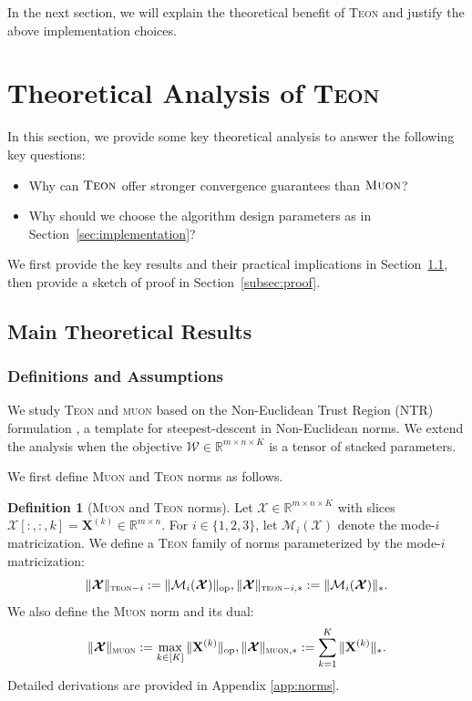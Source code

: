 \documentclass{article}
\newcommand{\ten}[1]{\bm{\mathcal{#1}}}
\newcommand{\mat}[1]{\mathbf{#1}}
\theoremstyle{plain}
\theoremstyle{definition}
\newtheorem{definition}[theorem]{Definition}
\theoremstyle{remark}
\begin{document}
In the next section, we will explain the theoretical benefit of \textsc{Teon} and justify the above implementation choices. 

\section{Theoretical Analysis of \textsc{Teon}}
\label{sec:Teon-theory}
In this section, we provide some key theoretical analysis to answer the following key questions: 
\begin{itemize}

\vspace{-5pt}
    \item Why can $\textsc{Teon}$ offer stronger convergence guarantees than $\textsc{Muon}$?
    \vspace{-5pt}
    \item Why should we choose the algorithm design parameters as in Section~\ref{sec:implementation}?
\end{itemize}

We first provide the key results and their practical implications in Section~\ref{sec:main_theo_results}, then provide a sketch of proof in Section~\ref{subsec:proof}.  

\subsection{Main Theoretical Results}
\label{sec:main_theo_results}


\subsubsection{Definitions and Assumptions}
\label{sec:definitions_and_assumptions}

We study \textsc{Teon} and \textsc{muon} based on the Non-Euclidean Trust Region (NTR) formulation \cite{kovalev2025understanding}, a template for steepest-descent in Non-Euclidean norms. We extend the analysis when the objective $\ten{W}\in\mathbb{R}^{m\times n\times K}$ is a tensor of stacked parameters.

We first define \textsc{Muon} and \textsc{Teon} norms as follows.

\begin{definition}[\textsc{Muon} and \textsc{Teon} norms]
\label{lem:norm_defs}
Let $\ten{X}\in\mathbb{R}^{m\times n\times K}$ with slices
$\ten{X}[:,:,k]=\mat{X}^{(k)}\in\mathbb{R}^{m\times n}$.
For $i\in\{1,2,3\}$, let $\mathcal{M}_i(\ten{X})$ denote the mode-$i$ matricization.
We define a \textsc{Teon} family of norms parameterized by the mode-$i$ matricization:
$$
\|\ten{X}\|_{\textsc{teon}-i}
:= \|\mathcal{M}_i(\ten{X})\|_{\mathrm{op}},
\|\ten{X}\|_{\textsc{teon}-i,*}
:= \|\mathcal{M}_i(\ten{X})\|_*.
$$
We also define the \textsc{Muon} norm and its dual:
$$
\|\ten{X}\|_{\textsc{muon}}
:= \max_{k\in[K]}\|\mat{X}^{(k)}\|_{\mathrm{op}},
\|\ten{X}\|_{\textsc{muon},*}
:= \sum_{k=1}^K \|\mat{X}^{(k)}\|_* .
$$
Detailed derivations are provided in Appendix \ref{app:norms}. 
\end{definition}
\end{document}
